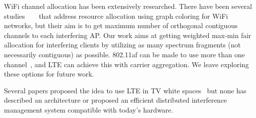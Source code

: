 WiFi channel allocation has been extensively researched. 
There have been several studies ~\cite{client-deriven} ~\cite{load-aware} that address resource allocation using graph coloring for WiFi networks, but their aim is to get maximum number of orthogonal contiguous channels to each interfering AP. Our work aims at getting weighted max-min fair allocation for interfering clients by utilizing as many spectrum fragments (not necessarily contiguous) as possible.
\wf 802.11af can be made to use more than one channel~\cite{whitefi}, and  LTE can achieve this with carrier aggregation. We leave exploring these options for future work. 

Several papers proposed the idea to use LTE in TV white spaces~\cite{dyspan_lte12, radisys} but none has described an architecture or proposed an efficient distributed interference management system compatible with today's hardware. 

